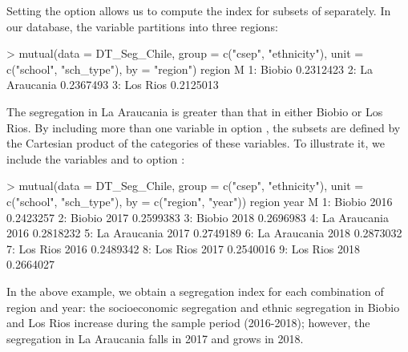 Setting the option  allows us to compute the index for subsets of  separately. In our database, the variable  partitions  into three regions:
\begin{example}
> mutual(data = DT_Seg_Chile,
        group = c("csep", "ethnicity"),
        unit = c("school", "sch_type"),
        by = "region")
         region         M
1:       Biobio 0.2312423
2: La Araucania 0.2367493
3:     Los Rios 0.2125013
\end{example}
The segregation in La Araucania is greater than that in either Biobio or Los Rios. By including more than one variable in option , the subsets are defined by the Cartesian product of the categories of these variables. To illustrate it, we include the variables  and  to option :
\begin{example}
> mutual(data = DT_Seg_Chile,
           group = c("csep", "ethnicity"),
           unit = c("school", "sch_type"),
           by = c("region", "year"))
         region year         M
1:       Biobio 2016 0.2423257
2:       Biobio 2017 0.2599383
3:       Biobio 2018 0.2696983
4: La Araucania 2016 0.2818232
5: La Araucania 2017 0.2749189
6: La Araucania 2018 0.2873032
7:     Los Rios 2016 0.2489342
8:     Los Rios 2017 0.2540016
9:     Los Rios 2018 0.2664027
\end{example}
In the above example, we obtain a segregation index for each combination of region and year: the socioeconomic segregation and ethnic segregation in Biobio and Los Rios increase during the sample period (2016-2018); however, the segregation in La Araucania falls in 2017 and grows in 2018.

